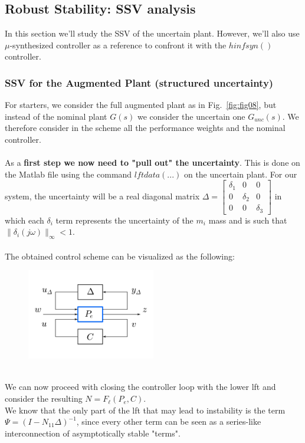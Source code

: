 \documentclass[a4paper, 12pt]{article}
\begin{document}
\subsection{Robust Stability: SSV analysis}
In this section we'll study the SSV of the uncertain plant. However, we'll also use $\mu$-synthesized controller as a reference to confront it with the $hinfsyn()$ controller.
\subsubsection{SSV for the Augmented Plant (structured uncertainty)}
For starters, we consider the full augmented plant as in Fig.~\ref{fig:fig08}, but instead of the nominal plant $G(s)$ we consider the uncertain one $G_{unc}(s)$. 
We therefore consider in the scheme all the performance weights and the nominal controller.
\\\\ As a \textbf{first step we now need to "pull out" the uncertainty}. This is done on the Matlab file using the command $lftdata(...)$ on the uncertain plant. For our system, the uncertainty will be a real diagonal matrix 
$\Delta = \begin{bmatrix}
\delta_1 & 0 & 0\\
0 & \delta_2 & 0\\
0 & 0 & \delta_3
\end{bmatrix}$ in which each $\delta_i$ term represents the uncertainty of the $m_i$ mass and is such that $\|\delta_i(j\omega)\|_\infty < 1$. 
\\\\
The obtained control scheme can be visualized as the following:
\begin{figure}[h!]
\centering
\includegraphics[width=0.5\textwidth]{Figures/extra01.pdf}
\end{figure}\\
We can now proceed with closing the controller loop with the lower lft and consider the resulting $N = F_\ell (P_e,C)$. \\
We know that the only part of the lft that may lead to instability is the term $\Psi = (I-N_{11}\Delta)^{-1}$, since every other term can be seen as a series-like interconnection of asymptotically stable "terms".
\end{document}
